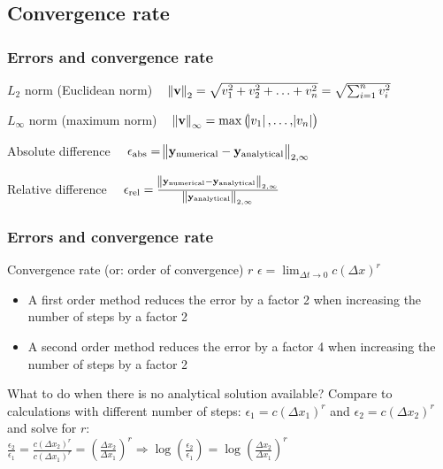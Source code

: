 \documentclass[11pt,table,final,fleqn,xcolor={usenames,dvipsnames,table}]{beamer}
\begin{document}
\subsection{Convergence rate}
\begin{frame}
  \frametitle{Errors and convergence rate}
  \begin{block}{$L_2$ norm (Euclidean norm)}
    $ \quad \norm{\mathbf{v}}_2 = \sqrt{v_1^2+v_2^2+\ldots+v_n^2} = \sqrt{\sum_{i=1}^n v_i^2} $
  \end{block}
  \begin{block}{$L_\infty$ norm (maximum norm)}
    $ \quad \norm{\mathbf{v}}_\infty = \text{max}\left( \abs{v_1},\ldots,\abs{v_n}\right) $
  \end{block}
  \begin{block}{Absolute difference}
    $ \quad \epsilon_\text{abs} = \norm{\mathbf{y}_\text{numerical} - \mathbf{y}_\text{analytical}}_{2,\infty} $
  \end{block}
  \begin{block}{Relative difference}
    $ \quad \epsilon_\text{rel} = \frac{\norm{\mathbf{y}_\text{numerical} - \mathbf{y}_\text{analytical}}_{2,\infty}}{\norm{\mathbf{y}_\text{analytical}}_{2,\infty}} $
  \end{block}
\end{frame}

\begin{frame}
  \frametitle{Errors and convergence rate}
  \footnotesize\selectfont
   \begin{block}{Convergence rate (or: order of convergence) $r$}
  $\displaystyle \epsilon = \lim_{\Delta t \rightarrow 0} c(\Delta x)^r $
  \end{block}
  \begin{itemize}
    \item A first order method reduces the error by a factor 2 when increasing the number of steps by a factor 2
    \item A second order method reduces the error by a factor 4 when increasing the number of steps by a factor 2
  \end{itemize}
  What to do when there is no analytical solution available?
  \pause
  Compare to calculations with different number of steps: $\epsilon_1 = c(\Delta x_1)^r $ and $\epsilon_2 = c(\Delta x_2)^r $ and solve for $r$: \\ \vfill
  $ \displaystyle
    \frac{\epsilon_2}{\epsilon_1} = \frac{c(\Delta x_2)^r}{c(\Delta x_1)^r} = \left(\frac{\Delta x_2}{\Delta x_1}\right)^r \Rightarrow \log\left( \frac{\epsilon_2}{\epsilon_1}\right) = \log\left( \frac{\Delta x_2}{\Delta x_1}\right)^r $ 
  \vfill
\end{frame}
\end{document}
